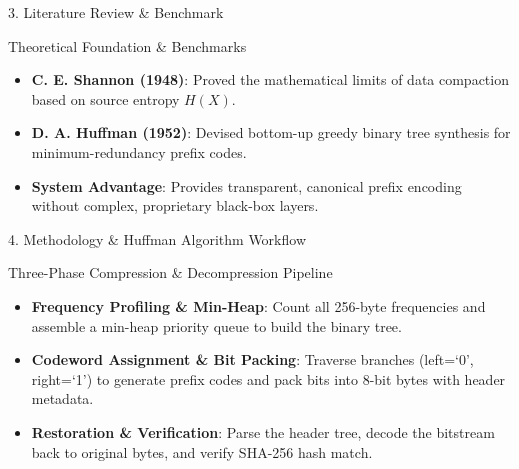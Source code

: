 \documentclass[aspectratio=169,11pt]{beamer}
\begin{document}
\begin{frame}{3. Literature Review \& Benchmark}
    \begin{block}{Theoretical Foundation \& Benchmarks}
        \begin{itemize}
            \item \textbf{C. E. Shannon (1948)}: Proved the mathematical limits of data compaction based on source entropy $H(X)$.
            \item \textbf{D. A. Huffman (1952)}: Devised bottom-up greedy binary tree synthesis for minimum-redundancy prefix codes.
            \item \textbf{System Advantage}: Provides transparent, canonical prefix encoding without complex, proprietary black-box layers.
        \end{itemize}
    \end{block}
\end{frame}

\begin{frame}{4. Methodology \& Huffman Algorithm Workflow}
    \begin{block}{Three-Phase Compression \& Decompression Pipeline}
        \begin{itemize}
            \item \textbf{Frequency Profiling \& Min-Heap}: Count all 256-byte frequencies and assemble a min-heap priority queue to build the binary tree.
            \item \textbf{Codeword Assignment \& Bit Packing}: Traverse branches (left=`0', right=`1') to generate prefix codes and pack bits into 8-bit bytes with header metadata.
            \item \textbf{Restoration \& Verification}: Parse the header tree, decode the bitstream back to original bytes, and verify SHA-256 hash match.
        \end{itemize}
    \end{block}
\end{frame}
\end{document}
